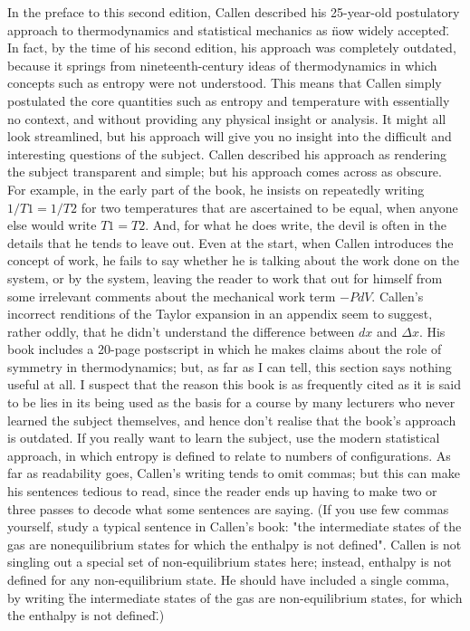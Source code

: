 \documentclass[10pt,a4paper]{book}
\theoremstyle{definition}
\begin{document}
In the preface to this second edition, Callen described his 25-year-old postulatory approach to thermodynamics and statistical mechanics as \"now widely accepted\".  In fact, by the time of his second edition, his approach was completely outdated, because it springs from nineteenth-century ideas of thermodynamics in which concepts such as entropy were not understood.  This means that Callen simply postulated the core quantities such as entropy and temperature with essentially no context, and without providing any physical insight or analysis.  It might all look streamlined, but his approach will give you no insight into the difficult and interesting questions of the subject.  Callen described his approach as rendering the subject transparent and simple; but his approach comes across as obscure.  
For example, in the early part of the book, he insists on repeatedly writing $1/T1=1/T2$ for two temperatures that are ascertained to be equal, when anyone else would write $T1=T2$.  And, for what he does write, the devil is often in the details that he tends to leave out.  Even at the start, when Callen introduces the concept of work, he fails to say whether he is talking about the work done on the system, or by the system, leaving the reader to work that out for himself from some irrelevant comments about the mechanical work term $-P dV$. 
Callen's incorrect renditions of the Taylor expansion in an appendix seem to suggest, rather oddly, that he didn't understand the difference between $dx$ and $\Delta x$.  His book includes a 20-page postscript in which he makes claims about the role of symmetry in thermodynamics; but, as far as I can tell, this section says nothing useful at all.  I suspect that the reason this book is as frequently cited as it is said to be lies in its being used as the basis for a course by many lecturers who never learned the subject themselves, and hence don't realise that the book's approach is outdated.  If you really want to learn the subject, use the modern statistical approach, in which entropy is defined to relate to numbers of configurations.  As far as readability goes, Callen's writing tends to omit commas; but this can make his sentences tedious to read, since the reader ends up having to make two or three passes to decode what some sentences are saying.  (If you use few commas yourself, study a typical sentence in Callen's book: "the intermediate states of the gas are nonequilibrium states for which the enthalpy is not defined".  Callen is not singling out a special set of non-equilibrium states here; instead, enthalpy is not defined for any non-equilibrium state.  He should have included a single comma, by writing \"the intermediate states of the gas are non-equilibrium states, for which the enthalpy is not defined\".)
\end{document}
